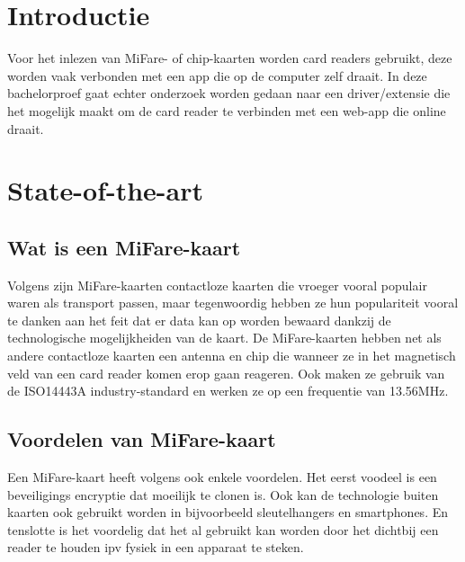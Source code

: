 \documentclass{hogent-article}
\affiliation{
  \textsuperscript{1} \href{mailto:wout.demaeseneer@student.hogent.be}{mailto:wout.demaeseneer@student.hogent.be}}
\begin{document}
\flushbottom %
\maketitle %
\tableofcontents %
\thispagestyle{empty} %


\section{Introductie}
Voor het inlezen van MiFare- of chip-kaarten worden card readers gebruikt, deze worden vaak verbonden met een app die op de computer zelf draait. In deze bachelorproef gaat echter onderzoek worden gedaan naar een driver/extensie die het mogelijk maakt om de card reader te verbinden met een web-app die online draait.

\section{State-of-the-art}
\subsection{Wat is een MiFare-kaart}
Volgens \textcite{Digitalid} zijn MiFare-kaarten contactloze kaarten die vroeger vooral populair waren als transport passen, maar tegenwoordig hebben ze hun populariteit vooral te danken aan het feit dat er data kan op worden bewaard dankzij de technologische mogelijkheiden van de kaart.
De MiFare-kaarten hebben net als andere contactloze kaarten een antenna en chip die wanneer ze in het magnetisch veld van een card reader komen erop gaan reageren. Ook maken ze gebruik van de ISO14443A industry-standard en werken ze op een frequentie van 13.56MHz.

\subsection{Voordelen van MiFare-kaart}
Een MiFare-kaart heeft volgens \textcite{Digitalid} ook enkele voordelen. Het eerst voodeel is een beveiligings encryptie dat moeilijk te clonen is. Ook kan de technologie buiten kaarten ook gebruikt worden in bijvoorbeeld sleutelhangers en smartphones. En tenslotte is het voordelig dat het al gebruikt kan worden door het dichtbij een reader te houden ipv fysiek in een apparaat te steken.
\end{document}
